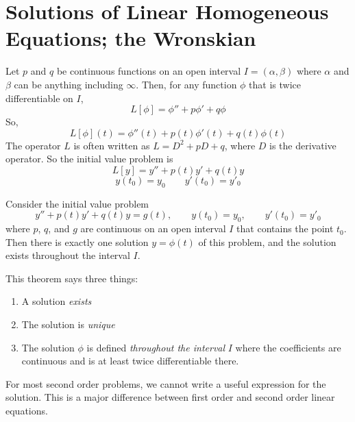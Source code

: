 \section{Solutions of Linear Homogeneous Equations; the Wronskian}
    Let $p$ and $q$ be continuous functions on an open interval $I = (\alpha, \beta)$ where $\alpha$ and $\beta$ can be anything including $\infty$. Then, for any function $\phi$ that is twice differentiable on $I$,
    \begin{equation*}
        L[\phi] = \phi'' + p\phi' + q\phi
    \end{equation*}
    So,
    \begin{equation*}
        L[\phi](t) = \phi''(t) + p(t)\phi'(t) + q(t)\phi(t)
    \end{equation*}
    The operator $L$ is often written as $L = D^2 + pD + q$, where $D$ is the derivative operator.
    \newline \indent
    So the initial value problem is
    \begin{equation*}
        L[y] = y'' + p(t)y' + q(t)y
    \end{equation*}
    \begin{equation*}
        y(t_0) = y_0 \qquad y'(t_0) = y'_0
    \end{equation*}
    \begin{theorem}
        Consider the initial value problem
        \begin{equation*}
            y'' + p(t)y' + q(t)y = g(t), \qquad y(t_0) = y_0, \qquad y'(t_0) = y'_0
        \end{equation*}
        where $p$, $q$, and $g$ are continuous on an open interval $I$ that contains the point $t_0$. Then there is exactly one solution $y = \phi(t)$ of this problem, and the solution exists throughout the interval $I$.
    \end{theorem}
    This theorem says three things:
    \begin{enumerate}
        \item A solution \textit{exists}
        \item The solution is \textit{unique}
        \item The solution $\phi$ is defined \textit{throughout the interval} $I$ where the coefficients are continuous and is at least twice differentiable there.
    \end{enumerate}
    \indent For most second order problems, we cannot write a useful expression for the solution. This is a major difference between first order and second order linear equations.
